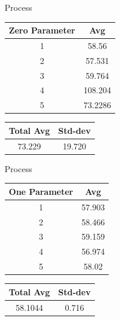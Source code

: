 \begin{enumerate}
    \item [Process]
        \begin{center}
            \begin{tabular}{||c c||} 
             \hline
             Zero Parameter & Avg \\ [0.5ex] 
             \hline\hline
             1 & 58.56  \\ 
             \hline
             2 & 57.531  \\ 
             \hline
             3 & 59.764  \\ 
             \hline
             4 & 108.204 \\ 
             \hline
             5 & 73.2286  \\ 
             \hline
             \hline
            \end{tabular}
                            \begin{tabular}{||c c||} 
                 \hline
                 Total Avg & Std-dev \\ [0.5ex] 
                 \hline\hline
                 73.229 & 19.720\\ 
                 \hline
                \hline
            \end{tabular}
        \end{center}
        \item [Process]
        \begin{center}
            \begin{tabular}{||c c||} 
             \hline
             One Parameter & Avg \\ [0.5ex] 
             \hline\hline
             1 & 57.903  \\ 
             \hline
             2 & 58.466  \\ 
             \hline
             3 & 59.159  \\ 
             \hline
             4 & 56.974 \\ 
             \hline
             5 & 58.02  \\ 
             \hline
             \hline
            \end{tabular}
            \begin{tabular}{||c c||} 
                 \hline
                 Total Avg & Std-dev \\ [0.5ex] 
                 \hline\hline
                 58.1044 & 0.716\\ 
                 \hline
                \hline

\end{tabular}
\end{center}
\end{enumerate}
